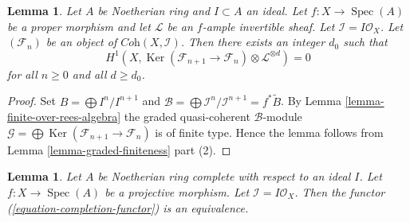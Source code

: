 \documentclass[10pt,a4paper]{amsart}
\theoremstyle{plain}
\newtheorem{lemma}[subsection]{Lemma}
\theoremstyle{definition}
\theoremstyle{remark}
\numberwithin{equation}{subsection}
\def\Spec{\mathop{\mathrm{Spec}}}
\def\Ker{\mathop{\mathrm{Ker}}}
\begin{document}
\begin{lemma}
\label{lemma-vanishing-projective}
Let $A$ be Noetherian ring and $I \subset A$ an ideal.
Let $f : X \to \Spec(A)$ be a proper morphism and let
$\mathcal{L}$ be an $f$-ample invertible sheaf. Let
$\mathcal{I} = I\mathcal{O}_X$. Let $(\mathcal{F}_n)$ be an
object of $\textit{Coh}(X, \mathcal{I})$. Then there exists an
integer $d_0$ such that
$$
H^1(X, \Ker(\mathcal{F}_{n + 1} \to \mathcal{F}_n)
\otimes \mathcal{L}^{\otimes d} )
= 0
$$
for all $n \geq 0$ and all $d \geq d_0$.
\end{lemma}

\begin{proof}
Set $B = \bigoplus I^n/I^{n + 1}$ and
$\mathcal{B} = \bigoplus \mathcal{I}^n/\mathcal{I}^{n + 1} = f^*\widetilde{B}$.
By Lemma \ref{lemma-finite-over-rees-algebra} the graded quasi-coherent
$\mathcal{B}$-module
$\mathcal{G} = \bigoplus \Ker(\mathcal{F}_{n + 1} \to \mathcal{F}_n)$
is of finite type. Hence the lemma follows from
Lemma \ref{lemma-graded-finiteness} part (2).
\end{proof}

\begin{lemma}
\label{lemma-existence-projective}
Let $A$ be Noetherian ring complete with respect to an ideal $I$.
Let $f : X \to \Spec(A)$ be a projective morphism. Let
$\mathcal{I} = I\mathcal{O}_X$.
Then the functor (\ref{equation-completion-functor}) is an equivalence.
\end{lemma}
\end{document}
